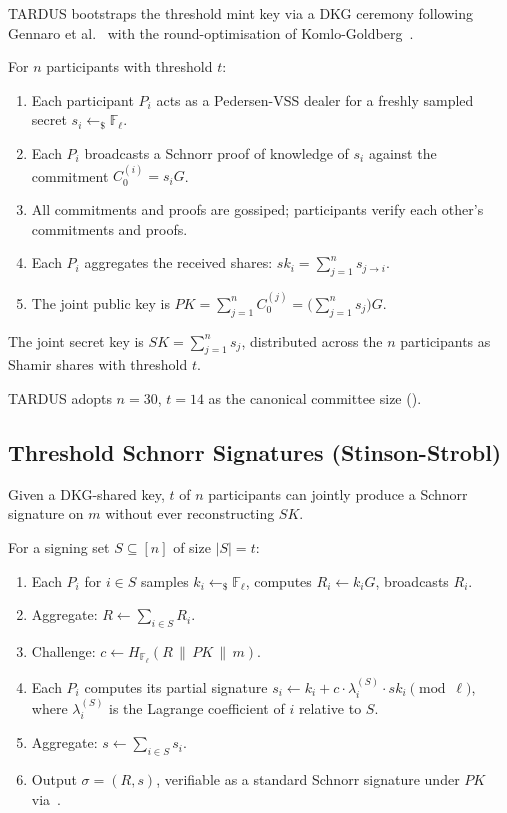 TARDUS bootstraps the threshold mint key via a DKG ceremony following Gennaro et al.~\cite{gennaro-jarecki-krawczyk-rabin1999} with the round-optimisation of Komlo-Goldberg~\cite{komlo-goldberg2020}.

\begin{construction}
\label{con:dkg}
For $n$ participants with threshold $t$:
\begin{enumerate}[leftmargin=2em,itemsep=0.2em]
  \item Each participant $P_i$ acts as a Pedersen-VSS dealer for a freshly sampled secret $s_i \leftarrow_\$ \mathbb{F}_\ell$.
  \item Each $P_i$ broadcasts a Schnorr proof of knowledge of $s_i$ against the commitment $C_0^{(i)} = s_i G$.
  \item All commitments and proofs are gossiped; participants verify each other's commitments and proofs.
  \item Each $P_i$ aggregates the received shares: $sk_i = \sum_{j=1}^{n} s_{j \to i}$.
  \item The joint public key is $PK = \sum_{j=1}^{n} C_0^{(j)} = \bigl( \sum_{j=1}^{n} s_j \bigr) G$.
\end{enumerate}
The joint secret key is $SK = \sum_{j=1}^{n} s_j$, distributed across the $n$ participants as Shamir shares with threshold $t$.
\end{construction}

TARDUS adopts $n = 30$, $t = 14$ as the canonical committee size ().

\subsection{Threshold Schnorr Signatures (Stinson-Strobl)}
\label{sec:threshold-schnorr}

Given a DKG-shared key, $t$ of $n$ participants can jointly produce a Schnorr signature on $m$ without ever reconstructing $SK$.

\begin{construction}
\label{con:threshold-schnorr}
For a signing set $S \subseteq [n]$ of size $|S| = t$:
\begin{enumerate}[leftmargin=2em,itemsep=0.2em]
  \item Each $P_i$ for $i \in S$ samples $k_i \leftarrow_\$ \mathbb{F}_\ell$, computes $R_i \gets k_i G$, broadcasts $R_i$.
  \item Aggregate: $R \gets \sum_{i \in S} R_i$.
  \item Challenge: $c \gets H_{\mathbb{F}_\ell}(R \,\|\, PK \,\|\, m)$.
  \item Each $P_i$ computes its partial signature $s_i \gets k_i + c \cdot \lambda_i^{(S)} \cdot sk_i \pmod{\ell}$, where $\lambda_i^{(S)}$ is the Lagrange coefficient of $i$ relative to $S$.
  \item Aggregate: $s \gets \sum_{i \in S} s_i$.
  \item Output $\sigma = (R, s)$, verifiable as a standard Schnorr signature under $PK$ via~.
\end{enumerate}
\end{construction}

